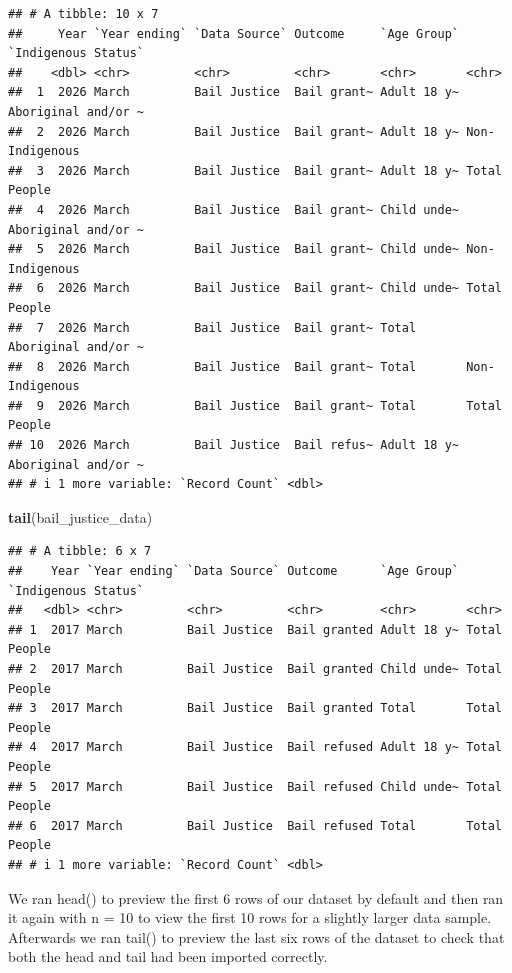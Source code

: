 \documentclass[
]{article}
\newenvironment{Shaded}{\begin{snugshade}}{\end{snugshade}}
\newcommand{\FunctionTok}[1]{\textcolor[rgb]{0.13,0.29,0.53}{\textbf{#1}}}
\newcommand{\NormalTok}[1]{#1}
\begin{document}
\begin{verbatim}
## # A tibble: 10 x 7
##     Year `Year ending` `Data Source` Outcome     `Age Group` `Indigenous Status`
##    <dbl> <chr>         <chr>         <chr>       <chr>       <chr>              
##  1  2026 March         Bail Justice  Bail grant~ Adult 18 y~ Aboriginal and/or ~
##  2  2026 March         Bail Justice  Bail grant~ Adult 18 y~ Non-Indigenous     
##  3  2026 March         Bail Justice  Bail grant~ Adult 18 y~ Total People       
##  4  2026 March         Bail Justice  Bail grant~ Child unde~ Aboriginal and/or ~
##  5  2026 March         Bail Justice  Bail grant~ Child unde~ Non-Indigenous     
##  6  2026 March         Bail Justice  Bail grant~ Child unde~ Total People       
##  7  2026 March         Bail Justice  Bail grant~ Total       Aboriginal and/or ~
##  8  2026 March         Bail Justice  Bail grant~ Total       Non-Indigenous     
##  9  2026 March         Bail Justice  Bail grant~ Total       Total People       
## 10  2026 March         Bail Justice  Bail refus~ Adult 18 y~ Aboriginal and/or ~
## # i 1 more variable: `Record Count` <dbl>
\end{verbatim}

\begin{Shaded}
\begin{Highlighting}[]
\FunctionTok{tail}\NormalTok{(bail\_justice\_data)}
\end{Highlighting}
\end{Shaded}

\begin{verbatim}
## # A tibble: 6 x 7
##    Year `Year ending` `Data Source` Outcome      `Age Group` `Indigenous Status`
##   <dbl> <chr>         <chr>         <chr>        <chr>       <chr>              
## 1  2017 March         Bail Justice  Bail granted Adult 18 y~ Total People       
## 2  2017 March         Bail Justice  Bail granted Child unde~ Total People       
## 3  2017 March         Bail Justice  Bail granted Total       Total People       
## 4  2017 March         Bail Justice  Bail refused Adult 18 y~ Total People       
## 5  2017 March         Bail Justice  Bail refused Child unde~ Total People       
## 6  2017 March         Bail Justice  Bail refused Total       Total People       
## # i 1 more variable: `Record Count` <dbl>
\end{verbatim}

We ran head() to preview the first 6 rows of our dataset by default and
then ran it again with n = 10 to view the first 10 rows for a slightly
larger data sample. Afterwards we ran tail() to preview the last six
rows of the dataset to check that both the head and tail had been
imported correctly.
\end{document}
